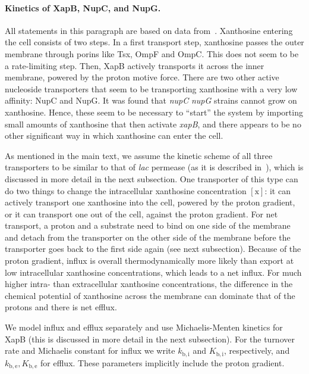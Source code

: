 \documentclass[10pt,letterpaper]{article}
\newcommand{\n}[1]{\mathrm{#1}}
\begin{document}
\paragraph*{Kinetics of XapB, NupC, and NupG.}
All statements in this paragraph are based on data
from~\cite{Norholm2001}. Xanthosine entering the cell consists of two steps. In a first transport step, xanthosine passes the
outer membrane through porins like Tsx, OmpF and OmpC. This does not seem to
be a rate-limiting step. Then, XapB actively transports it across the inner
membrane, powered by the proton motive force. There are two other active
nucleoside transporters that seem to be transporting xanthosine with a very
low affinity: NupC and NupG. It was found that \textDelta\emph{nupC}
\textDelta\emph{nupG} strains cannot grow on xanthosine. Hence, these seem
to be necessary to ``start'' the system by importing small amounts of
xanthosine that then activate \emph{xapB}, and there appears to be no other
significant way in which xanthosine can enter the cell. 

As mentioned in the main text, we assume the kinetic scheme of all three transporters to be similar to that
of \emph{lac} permease (as it is described in~\cite{Kaback2015}), which is discussed in more detail in the next subsection. One transporter of this type can do two things to change the intracellular xanthosine
concentration $\n{[x]}$: it can actively transport one xanthosine into the
cell, powered by the proton gradient, or it can transport one out of the
cell, against the proton gradient. For net transport, a proton and a
substrate need to bind on one side of the membrane and detach from the
transporter on the other side of the membrane before the transporter goes
back to the first side again (see next subsection). Because of the
proton gradient, influx is overall thermodynamically more likely than export
at low intracellular xanthosine concentrations, which leads to a net influx.
For much higher intra- than extracellular xanthosine concentrations, the
difference in the chemical potential of xanthosine across the membrane can
dominate that of the protons and there is net efflux. 

We model influx and efflux separately and use Michaelis-Menten kinetics for
XapB (this is discussed in more detail in the next subsection). For the turnover rate and Michaelis constant for influx we write
$k_{\n{b, i}}$ and $K_{\n{b, i}}$, respectively, and $k_{\n{b, e}}, K_{\n{b,
		e}}$ for efflux. These parameters implicitly include the proton gradient.
\end{document}
